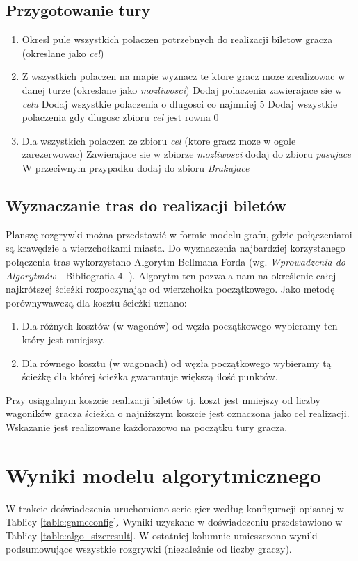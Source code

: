 \documentclass[12pt, oneside]{report}
\begin{document}
\subsection{Przygotowanie tury}
\begin{enumerate}
	\item Okresl pule wszystkich polaczen potrzebnych do realizacji biletow gracza (okreslane jako \textit{cel})
	\item Z wszystkich polaczen na mapie wyznacz te ktore gracz moze zrealizowac w danej turze (okreslane jako \textit{mozliwosci})
	\subitem Dodaj polaczenia zawierajace sie w \textit{celu}
	\subitem Dodaj wszystkie polaczenia o dlugosci co najmniej 5
	\subitem Dodaj wszystkie polaczenia gdy dlugosc zbioru \textit{cel} jest rowna 0
	\item Dla wszystkich polaczen ze zbioru \textit{cel} (ktore gracz moze w ogole zarezerwowac)
	\subitem Zawierajace sie w zbiorze \textit{mozliwosci} dodaj do zbioru \textit{pasujace}
	\subitem W przeciwnym przypadku dodaj do zbioru \textit{Brakujace}
	
\end{enumerate}
\subsection{Wyznaczanie tras do realizacji biletów}
Planszę rozgrywki można przedstawić w formie modelu grafu, gdzie połączeniami są krawędzie a wierzchołkami miasta. Do wyznaczenia najbardziej korzystanego połączenia tras wykorzystano Algorytm Bellmana-Forda (wg. \textit{Wprowadzenia do Algorytmów} - Bibliografia 4. ). Algorytm ten pozwala nam na określenie całej najkrótszej ścieżki rozpoczynając od wierzchołka początkowego. Jako metodę porównywawczą dla kosztu ścieżki uznano:
\begin{enumerate}
	\item Dla różnych kosztów (w wagonów) od węzła początkowego wybieramy ten który jest mniejszy.
	\item Dla równego kosztu (w wagonach) od węzła początkowego wybieramy tą ścieżkę dla której ścieżka gwarantuje większą ilość punktów.
\end{enumerate}
Przy osiągalnym koszcie realizacji biletów tj. koszt jest mniejszy od liczby wagoników gracza ścieżka o najniższym koszcie jest oznaczona jako cel realizacji. Wskazanie jest realizowane każdorazowo na początku tury gracza.
\section{Wyniki modelu algorytmicznego}
W trakcie doświadczenia uruchomiono serie gier według konfiguracji opisanej w Tablicy \ref{table:gameconfig}. Wyniki uzyskane w doświadczeniu przedstawiono w Tablicy \ref{table:algo_sizeresult}. W ostatniej kolumnie umieszczono wyniki podsumowujące wszystkie rozgrywki (niezależnie od liczby graczy).
\end{document}

